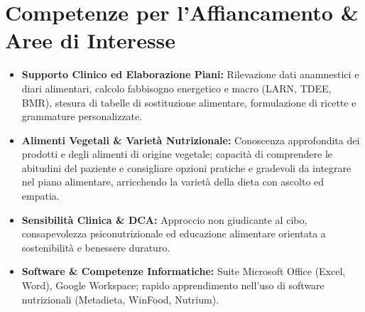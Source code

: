 \documentclass[10pt, letterpaper]{article}
\begin{document}
    \vspace{0.1 cm}

    \section{Competenze per l'Affiancamento \& Aree di Interesse}
    \begin{itemize}[leftmargin=*,noitemsep,topsep=0pt]
        \item \textbf{Supporto Clinico ed Elaborazione Piani:} Rilevazione dati anamnestici e diari alimentari, calcolo fabbisogno energetico e macro (LARN, TDEE, BMR), stesura di tabelle di sostituzione alimentare, formulazione di ricette e grammature personalizzate.
        \item \textbf{Alimenti Vegetali \& Varietà Nutrizionale:} Conoscenza approfondita dei prodotti e degli alimenti di origine vegetale; capacità di comprendere le abitudini del paziente e consigliare opzioni pratiche e gradevoli da integrare nel piano alimentare, arricchendo la varietà della dieta con ascolto ed empatia.
        \item \textbf{Sensibilità Clinica \& DCA:} Approccio non giudicante al cibo, consapevolezza psiconutrizionale ed educazione alimentare orientata a sostenibilità e benessere duraturo.
        \item \textbf{Software \& Competenze Informatiche:} Suite Microsoft Office (Excel, Word), Google Workspace; rapido apprendimento nell'uso di software nutrizionali (Metadieta, WinFood, Nutrium).
    \end{itemize}
\end{document}
